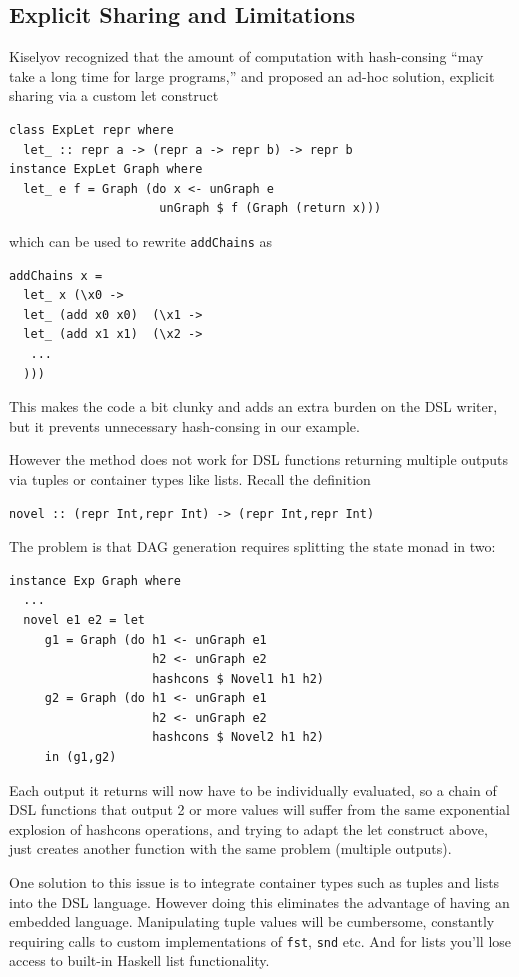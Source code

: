 \documentclass[runningheads]{llncs}
\begin{document}
\subsection{Explicit Sharing and Limitations} \label{limitexplicit}

Kiselyov \cite{kiselyov:sharing} recognized that the amount of computation with hash-consing ``may take a long time for large programs,'' 
and proposed an ad-hoc solution, explicit sharing via a
custom let construct
\begin{verbatim}
class ExpLet repr where
  let_ :: repr a -> (repr a -> repr b) -> repr b
instance ExpLet Graph where
  let_ e f = Graph (do x <- unGraph e
                     unGraph $ f (Graph (return x)))
\end{verbatim}
which can be used to rewrite \texttt{addChains} as
\begin{verbatim}
addChains x =
  let_ x (\x0 ->
  let_ (add x0 x0)  (\x1 ->
  let_ (add x1 x1)  (\x2 ->
   ...
  )))
\end{verbatim}
This makes the code a bit clunky and adds an extra burden on the DSL writer, but
it prevents unnecessary hash-consing in our example.

However the method does not work for DSL functions
returning multiple outputs via tuples or container types like lists. Recall the definition
\begin{verbatim}
novel :: (repr Int,repr Int) -> (repr Int,repr Int)
\end{verbatim}
The problem is that DAG generation requires splitting the state monad in two:
\begin{verbatim}
instance Exp Graph where
  ...
  novel e1 e2 = let
     g1 = Graph (do h1 <- unGraph e1
                    h2 <- unGraph e2
                    hashcons $ Novel1 h1 h2)
     g2 = Graph (do h1 <- unGraph e1
                    h2 <- unGraph e2
                    hashcons $ Novel2 h1 h2)
     in (g1,g2)
\end{verbatim}
Each output it returns will now have to be individually evaluated, so a
chain of DSL functions that output 2 or more values will suffer from the same
exponential explosion of hashcons operations,
and trying to adapt the let construct above,
just creates another function with the same problem (multiple outputs).

One solution to this issue is to integrate container types such as tuples and
lists into the DSL language. However doing this eliminates the
advantage of having an embedded language.
Manipulating tuple values will be
cumbersome, constantly requiring calls to custom implementations of \texttt{fst}, \texttt{snd} etc. 
And for lists you'll lose access to built-in Haskell
list functionality.
\end{document}
